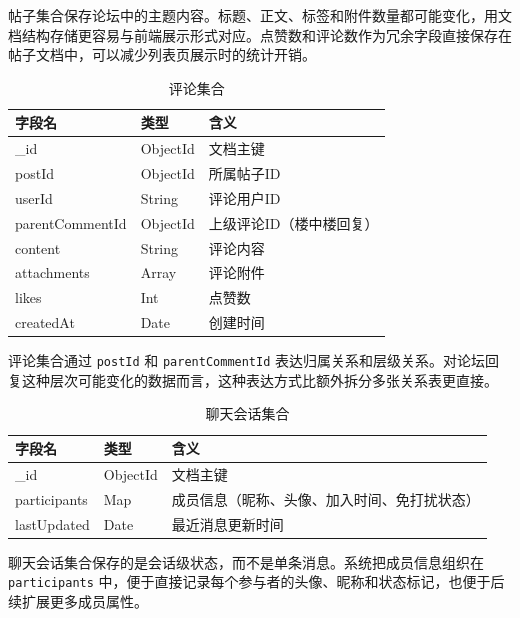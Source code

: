 帖子集合保存论坛中的主题内容。标题、正文、标签和附件数量都可能变化，用文档结构存储更容易与前端展示形式对应。点赞数和评论数作为冗余字段直接保存在帖子文档中，可以减少列表页展示时的统计开销。

\begin{table}[!htbp]
  \caption{评论集合}
  \label{tab:comments-collection}
  \centering
  \small
  \begin{tabular}{p{3.0cm}p{2.3cm}p{7.0cm}}
    \toprule
    字段名 & 类型 & 含义 \\
    \midrule
    \_id & ObjectId & 文档主键 \\
    postId & ObjectId & 所属帖子ID \\
    userId & String & 评论用户ID \\
    parentCommentId & ObjectId & 上级评论ID（楼中楼回复） \\
    content & String & 评论内容 \\
    attachments & Array & 评论附件 \\
    likes & Int & 点赞数 \\
    createdAt & Date & 创建时间 \\
    \bottomrule
  \end{tabular}
\end{table}

评论集合通过 \texttt{postId} 和 \texttt{parentCommentId} 表达归属关系和层级关系。对论坛回复这种层次可能变化的数据而言，这种表达方式比额外拆分多张关系表更直接。

\begin{table}[!htbp]
  \caption{聊天会话集合}
  \label{tab:chat-collection}
  \centering
  \small
  \begin{tabular}{p{3.0cm}p{2.3cm}p{7.0cm}}
    \toprule
    字段名 & 类型 & 含义 \\
    \midrule
    \_id & ObjectId & 文档主键 \\
    participants & Map & 成员信息（昵称、头像、加入时间、免打扰状态） \\
    lastUpdated & Date & 最近消息更新时间 \\
    \bottomrule
  \end{tabular}
\end{table}

聊天会话集合保存的是会话级状态，而不是单条消息。系统把成员信息组织在 \texttt{participants} 中，便于直接记录每个参与者的头像、昵称和状态标记，也便于后续扩展更多成员属性。

